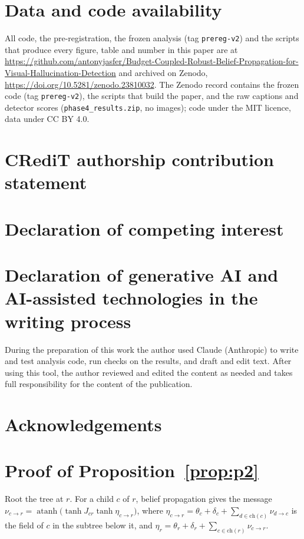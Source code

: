 \section*{Data and code availability}
All code, the pre-registration, the frozen analysis (tag \texttt{prereg-v2}) and the scripts that produce every figure, table and number in this paper are at \url{https://github.com/antonyjasfer/Budget-Coupled-Robust-Belief-Propagation-for-Visual-Hallucination-Detection} and archived on Zenodo, \url{https://doi.org/10.5281/zenodo.23810032}. The Zenodo record contains the frozen code (tag \texttt{prereg-v2}), the scripts that build the paper, and the raw captions and detector scores (\texttt{phase4\_results.zip}, no images); code under the MIT licence, data under CC BY 4.0.

\section*{CRediT authorship contribution statement}

\section*{Declaration of competing interest}

\section*{Declaration of generative AI and AI-assisted technologies in the writing process}
 During the preparation of this work the author used Claude (Anthropic) to write and test analysis code, run checks on the results, and draft and edit text. After using this tool, the author reviewed and edited the content as needed and takes full responsibility for the content of the publication.

\section*{Acknowledgements}

\appendix

\section{Proof of Proposition~\ref{prop:p2}}\label{app:p2}
Root the tree at $r$. For a child $c$ of $r$, belief propagation gives the message $\nu_{c\to r}=\operatorname{atanh}\big(\tanh J_{cr}\tanh\eta_{c\to r}\big)$, where $\eta_{c\to r}=\theta_c+\delta_c+\sum_{d\in\mathrm{ch}(c)}\nu_{d\to c}$ is the field of $c$ in the subtree below it, and $\eta_r=\theta_r+\delta_r+\sum_{c\in\mathrm{ch}(r)}\nu_{c\to r}$.

